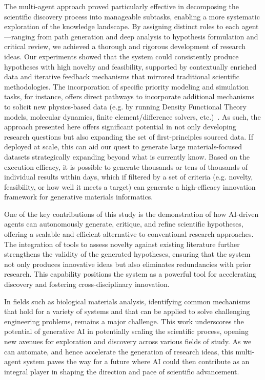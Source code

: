 \documentclass{article}
\begin{document}
The multi-agent approach proved particularly effective in decomposing the scientific discovery process into manageable subtasks, enabling a more systematic exploration of the knowledge landscape. By assigning distinct roles to each agent—ranging from path generation and deep analysis to hypothesis formulation and critical review, we achieved a thorough and rigorous development of research ideas. Our experiments showed that the system could consistently produce hypotheses with high novelty and feasibility, supported by contextually enriched data and iterative feedback mechanisms that mirrored traditional scientific methodologies. The incorporation of specific priority modeling and simulation tasks, for instance, offers direct pathways to incorporate additional mechanisms to solicit new physics-based data (e.g. by running Density Functional Theory models, molecular dynamics, finite element/difference solvers, etc.)~\cite{ghafarollahi2024protagents,ghafarollahi2024atomagents}. As such, the approach presented here offers significant potential in not only developing research questions but also expanding the set of first-principles sourced data. If deployed at scale, this can aid our quest to generate large materials-focused datasets strategically expanding beyond what is currently know. Based on the execution efficacy, it is possible to generate thousands or tens of thousands of individual results within days, which if filtered by a set of criteria (e.g. novelty, feasibility, or how well it meets a target) can generate a high-efficacy innovation framework for generative materials informatics. 

One of the key contributions of this study is the demonstration of how AI-driven agents can autonomously generate, critique, and refine scientific hypotheses, offering a scalable and efficient alternative to conventional research approaches. The integration of tools to assess novelty against existing literature further strengthens the validity of the generated hypotheses, ensuring that the system not only produces innovative ideas but also eliminates redundancies with prior research. This capability positions the system as a powerful tool for accelerating discovery and fostering cross-disciplinary innovation.

In fields such as biological materials analysis, identifying common mechanisms that hold for a variety of systems and that can be applied to solve challenging engineering problems, remains a major challenge. This  work underscores the potential of generative AI in potentially scaling the scientific process, opening new avenues for exploration and discovery across various fields of study. As we can automate, and hence accelerate the generation of research ideas, this multi-agent system paves the way for a future where AI could then contribute as an integral player in shaping the direction and pace of scientific advancement. 
\end{document}

